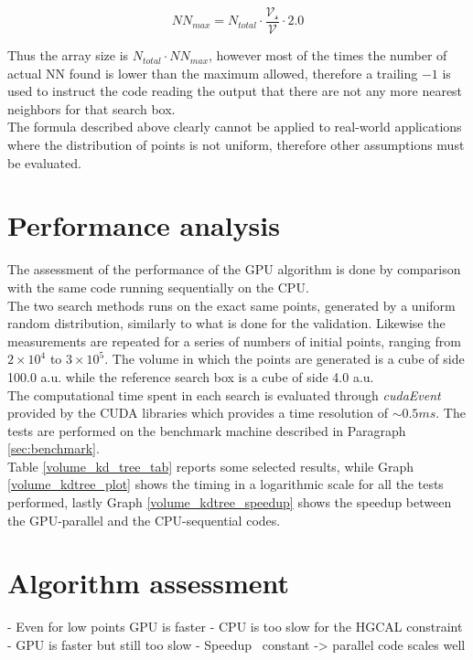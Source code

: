 \begin{center}
\begin{equation}
N\!N_{max} =  N_{total} \cdot \dfrac{\mathcal{V_s}}{\mathcal{V}} \cdot 2.0
\end{equation}
\end{center}

Thus the array size is $N_{total} \cdot N\!N_{max}$, however most of the times the number of actual NN found is lower than the maximum allowed, therefore a trailing $-1$ is used to instruct the code reading the output that there are not any more nearest neighbors for that search box.\\
The formula described above clearly cannot be applied to real-world applications where the distribution of points is not uniform, therefore other assumptions must be evaluated.\\

\section{Performance analysis}
The assessment of the performance of the GPU algorithm is done by comparison with the same code running sequentially on the CPU.\\
The two search methods runs on the exact same points, generated by a uniform random distribution, similarly to what is done for the validation. Likewise the measurements are repeated for a series of numbers of initial points, ranging from  $2 \times 10^{4}$ to $3 \times 10^{5}$. The volume in which the points are generated is a cube of side 100.0 a.u. while the reference search box is a cube of side 4.0 a.u.\\
The computational time spent in each search is evaluated through \textit{cudaEvent} provided by the CUDA libraries which provides a time resolution of $\sim 0.5\unit{ms}$. The tests are performed on the benchmark machine described in Paragraph \ref{sec:benchmark}.\\
Table \ref{volume_kd_tree_tab} reports some selected results, while Graph \ref{volume_kdtree_plot} shows the timing in a logarithmic scale for all the tests performed, lastly Graph \ref{volume_kdtree_speedup} shows the speedup between the GPU-parallel and the CPU-sequential codes.\\

\section{Algorithm assessment}
- Even for low points GPU is faster
- CPU is too slow for the HGCAL constraint
- GPU is faster but still too slow
- Speedup ~constant -> parallel code scales well




